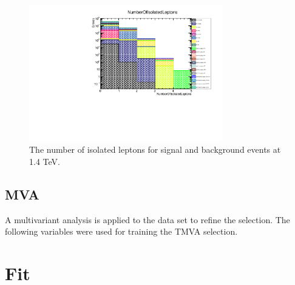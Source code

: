 \begin{figure}
\centering
\includegraphics[width=0.75\textwidth]{PhysicsAnalysis/Plots/PreSelection/NumberOfIsolatedLeptons.pdf}
\caption[Number of isolated leptons at 1.4 TeV.]{The number of isolated leptons for signal and background events at 1.4 TeV.}
\label{fig:preselection3}
\end{figure}

\subsection{MVA}
A multivariant analysis is applied to the data set to refine the selection. The following variables were used for training the TMVA selection.

\section{Fit}

